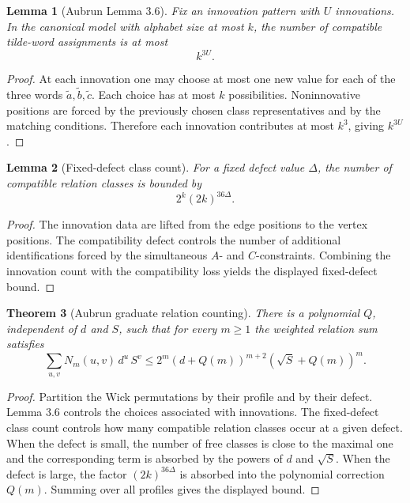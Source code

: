 \documentclass[11pt,oneside]{book}
\newtheorem{theorem}{Theorem}[chapter]
\newtheorem{lemma}[theorem]{Lemma}
\newcommand{\1}{\mathbf 1}
\begin{document}
\begin{lemma}[Aubrun Lemma 3.6]
Fix an innovation pattern with \(U\) innovations.  In the canonical model with
alphabet size at most \(k\), the number of compatible tilde-word assignments
is at most
\[
  k^{3U}.
\]
\end{lemma}

\begin{proof}
At each innovation one may choose at most one new value for each of the three
words \(\widetilde a,\widetilde b,\widetilde c\).  Each choice has at most
\(k\) possibilities.  Noninnovative positions are forced by the previously
chosen class representatives and by the matching conditions.  Therefore each
innovation contributes at most \(k^3\), giving \(k^{3U}\).
\end{proof}

\begin{lemma}[Fixed-defect class count]
For a fixed defect value \(\Delta\), the number of compatible relation classes
is bounded by
\[
  2^k(2k)^{36\Delta}.
\]
\end{lemma}

\begin{proof}
The innovation data are lifted from the edge positions to the vertex positions.
The compatibility defect controls the number of additional identifications
forced by the simultaneous \(A\)- and \(C\)-constraints.  Combining the
innovation count with the compatibility loss yields the displayed
fixed-defect bound.
\end{proof}

\begin{theorem}[Aubrun graduate relation counting]
There is a polynomial \(Q\), independent of \(d\) and \(S\), such that for
every \(m\ge1\) the weighted relation sum satisfies
\[
  \sum_{u,v}N_m(u,v)\,d^u\,S^v
  \le
  2^m(d+Q(m))^{m+2}(\sqrt S+Q(m))^m.
\]
\end{theorem}

\begin{proof}
Partition the Wick permutations by their profile and by their defect.  Lemma
3.6 controls the choices associated with innovations.  The fixed-defect class
count controls how many compatible relation classes occur at a given defect.
When the defect is small, the number of free classes is close to the maximal
one and the corresponding term is absorbed by the powers of \(d\) and
\(\sqrt S\).  When the defect is large, the factor \((2k)^{36\Delta}\) is
absorbed into the polynomial correction \(Q(m)\).  Summing over all profiles
gives the displayed bound.
\end{proof}
\end{document}

